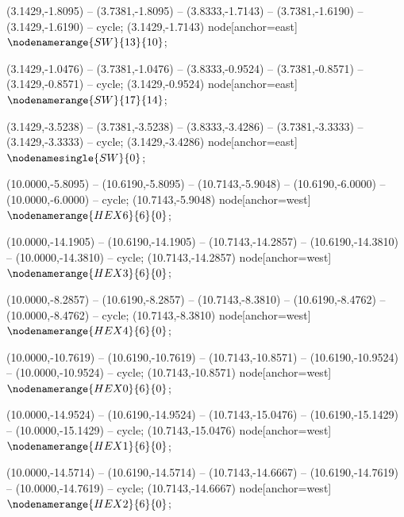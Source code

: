    (3.1429,-1.8095) -- (3.7381,-1.8095) -- (3.8333,-1.7143) -- (3.7381,-1.6190) -- (3.1429,-1.6190) -- cycle;
   (3.1429,-1.7143) node[anchor=east] {$\nodenamerange{SW}{13}{10}$};

   (3.1429,-1.0476) -- (3.7381,-1.0476) -- (3.8333,-0.9524) -- (3.7381,-0.8571) -- (3.1429,-0.8571) -- cycle;
   (3.1429,-0.9524) node[anchor=east] {$\nodenamerange{SW}{17}{14}$};

   (3.1429,-3.5238) -- (3.7381,-3.5238) -- (3.8333,-3.4286) -- (3.7381,-3.3333) -- (3.1429,-3.3333) -- cycle;
   (3.1429,-3.4286) node[anchor=east] {$\nodenamesingle{SW}{0}$};

   (10.0000,-5.8095) -- (10.6190,-5.8095) -- (10.7143,-5.9048) -- (10.6190,-6.0000) -- (10.0000,-6.0000) -- cycle;
   (10.7143,-5.9048) node[anchor=west] {$\nodenamerange{HEX6}{6}{0}$};

   (10.0000,-14.1905) -- (10.6190,-14.1905) -- (10.7143,-14.2857) -- (10.6190,-14.3810) -- (10.0000,-14.3810) -- cycle;
   (10.7143,-14.2857) node[anchor=west] {$\nodenamerange{HEX3}{6}{0}$};

   (10.0000,-8.2857) -- (10.6190,-8.2857) -- (10.7143,-8.3810) -- (10.6190,-8.4762) -- (10.0000,-8.4762) -- cycle;
   (10.7143,-8.3810) node[anchor=west] {$\nodenamerange{HEX4}{6}{0}$};

   (10.0000,-10.7619) -- (10.6190,-10.7619) -- (10.7143,-10.8571) -- (10.6190,-10.9524) -- (10.0000,-10.9524) -- cycle;
   (10.7143,-10.8571) node[anchor=west] {$\nodenamerange{HEX0}{6}{0}$};

   (10.0000,-14.9524) -- (10.6190,-14.9524) -- (10.7143,-15.0476) -- (10.6190,-15.1429) -- (10.0000,-15.1429) -- cycle;
   (10.7143,-15.0476) node[anchor=west] {$\nodenamerange{HEX1}{6}{0}$};

   (10.0000,-14.5714) -- (10.6190,-14.5714) -- (10.7143,-14.6667) -- (10.6190,-14.7619) -- (10.0000,-14.7619) -- cycle;
   (10.7143,-14.6667) node[anchor=west] {$\nodenamerange{HEX2}{6}{0}$};

